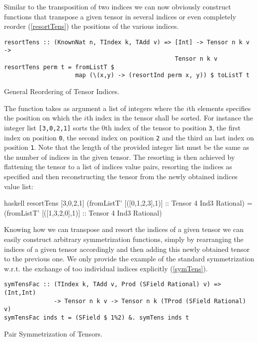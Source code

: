 Similar to the transposition of two indices we can now obviously construct functions that transpose a given tensor in several indices or even completely reorder (\ref{resortTens}) the positions of the various indices. 
\begin{listing}[hbt!]
\begin{verbatim}
resortTens :: (KnownNat n, TIndex k, TAdd v) => [Int] -> Tensor n k v ->
                                                Tensor n k v
resortTens perm t = fromListT $
                    map (\(x,y) -> (resortInd perm x, y)) $ toListT t
\end{verbatim} 
\caption{General Reordering of Tensor Indices.}\label{resortTens}
\end{listing}
The function takes as argument a list of integers where the $i$th elements specifies the position on which the $i$th index in the tensor shall be sorted. For instance the integer list \texttt{[3,0,2,1]} sorts the 0th index of the tensor to position \texttt{3}, the first index on position \texttt{0}, the second index on position \texttt{2} and the third an last index on position \texttt{1}. Note that the length of the provided integer list must be the same as the number of indices in the given tensor.  The resorting is then achieved by flattening the tensor to a list of indices value pairs, resorting the indices as specified and then reconstructing the tensor from the newly obtained indices value list:
\begin{center}
\begin{cminted}{haskell}
resortTens [3,0,2,1] (fromListT' [([0,1,2,3],1)] :: Tensor 4 Ind3 Rational)
= (fromListT' [([1,3,2,0],1)] :: Tensor 4 Ind3 Rational)
\end{cminted}
\end{center}
Knowing how we can transpose and resort the indices of a given tensor we can easily construct arbitrary symmetrization functions, simply by rearranging the indices of a given tensor accordingly and then adding this newly obtained tensor to the previous one. We only provide the example of the standard symmetrization w.r.t. the exchange of too individual indices explicitly (\ref{symTens}).

\begin{listing}[hbt!] 
\begin{verbatim}
symTensFac :: (TIndex k, TAdd v, Prod (SField Rational) v) => (Int,Int)
              -> Tensor n k v -> Tensor n k (TProd (SField Rational) v)
symTensFac inds t = (SField $ 1%2) &. symTens inds t
\end{verbatim} 
\caption{Pair Symmetrization of Tensors.}\label{symTens}
\end{listing}


